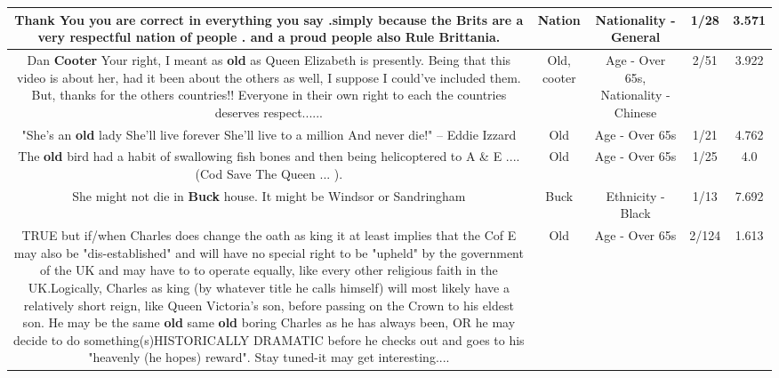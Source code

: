 \documentclass[11pt]{article}
\newlength\mylength
\begin{document}
\begin{center}
\begin{longtable}{|C{.65\mylength}|C{.30\mylength}|C{.12\mylength}|C{.12\mylength}|C{.12\mylength}|}
  \small Thank You you are correct in everything you say  .simply because the Brits are a very respectful \textbf{nation} of people . and a proud  people also Rule Brittania.\normalsize   & Nation & Nationality - General & 1/28 & 3.571 \\  \hline
  \small Dan \textbf{Cooter} Your right, I meant as \textbf{old} as Queen Elizabeth is presently.  Being that this video is about her, had it been about the others as well, I suppose I could've included them.  But, thanks for the others countries!!  Everyone in their own right to each the countries deserves respect......\normalsize   & Old, cooter & Age - Over 65s, Nationality - Chinese & 2/51 & 3.922 \\  \hline
  \small "She's an \textbf{old} lady  She'll live forever  She'll live to a million  And never die!" -- Eddie Izzard\normalsize   & Old & Age - Over 65s & 1/21 & 4.762 \\  \hline
  \small The \textbf{old} bird had a habit of swallowing fish bones and then being helicoptered  to A \& E .... (Cod Save The Queen ... ).\normalsize   & Old & Age - Over 65s & 1/25 & 4.0 \\  \hline
  \small She might not die in \textbf{Buck} house. It might be Windsor or Sandringham\normalsize   & Buck & Ethnicity - Black & 1/13 & 7.692 \\  \hline
  \small {} TRUE but if/when Charles does change the oath as king it at least implies that the Cof E may also be  "dis-established" and will have no special right to be "upheld" by the government of the UK and may have to to operate equally, like every other religious faith in the UK.Logically, Charles as king (by whatever title he calls himself) will most likely have a relatively short reign, like Queen Victoria's son, before passing on the Crown to his eldest son. He may be the same \textbf{old} same \textbf{old} boring  Charles as he has always been, OR he may decide to do something(s)HISTORICALLY DRAMATIC before he checks out and goes to his "heavenly (he hopes) reward". Stay tuned-it may get interesting....\normalsize   & Old & Age - Over 65s & 2/124 & 1.613 \\  \hline

\end{longtable}
\end{center}
\end{document}
